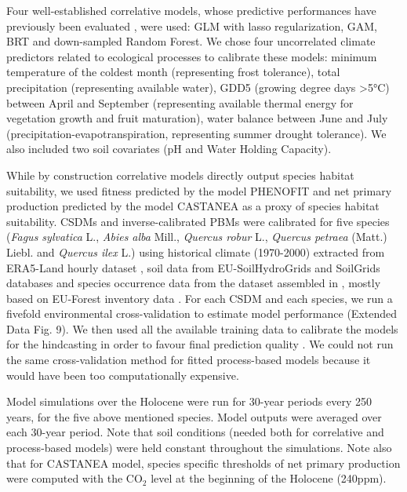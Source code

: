 \documentclass[pdflatex, sn-nature]{sn-jnl}%
\newcommand{\textappr}{\raisebox{0.5ex}{\texttildelow}} %
\begin{document}
Four well-established correlative models, whose predictive performances have previously been evaluated \cite{Valavi2022}, were used: GLM with lasso regularization, GAM, BRT and down-sampled Random Forest. We chose four uncorrelated climate predictors related to ecological processes to calibrate these models: minimum temperature of the coldest month (representing frost tolerance), total precipitation (representing available water), GDD5 (growing degree days  \textgreater5°C) between April and September (representing available thermal energy for vegetation growth and fruit maturation), water balance between June and July (precipitation-evapotranspiration, representing summer drought tolerance). We also included two soil covariates (pH and Water Holding Capacity).
  
While by construction correlative models directly output species habitat suitability, we used fitness predicted by the model PHENOFIT and net primary production predicted by the model CASTANEA as a proxy of species habitat suitability. 
CSDMs and inverse-calibrated PBMs were calibrated for five species (\textit{Fagus sylvatica} L., \textit{Abies alba} Mill., \textit{Quercus robur} L., \textit{Quercus petraea}  (Matt.) Liebl. and \textit{Quercus ilex} L.) using historical climate (1970-2000) extracted from ERA5-Land hourly dataset \cite{MunozSabater2021}, soil data from EU-SoilHydroGrids \cite{Toth2017} and SoilGrids \cite{Hengl2017} databases and species occurrence data from the dataset assembled in \cite{VanderMeersch2023}, mostly based on EU-Forest inventory data \cite{Mauri2017}. For each CSDM and each species, we run a fivefold environmental cross-validation to estimate model performance (Extended Data Fig. 9). We then used all the available training data to calibrate the models for the hindcasting in order to favour final prediction quality \cite{Roberts2017}. We could not run the same cross-validation method for fitted process-based models because it would have been too computationally expensive. 

Model simulations over the Holocene were run for 30-year periods every 250 years, for the five above mentioned species. Model outputs were averaged over each 30-year period. Note that soil conditions (needed both for correlative and process-based models) were held constant throughout the simulations. Note also that for CASTANEA model, species specific thresholds of net primary production were computed with the CO$_2$ level at the beginning of the Holocene (\textappr240ppm).
\end{document}
